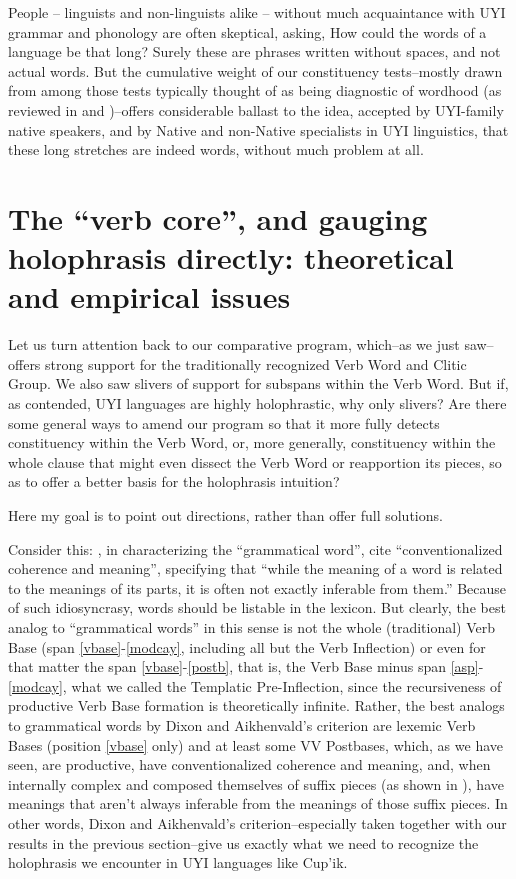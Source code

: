 \documentclass[output=paper]{langscibook}
\begin{document}
People -- linguists and non-linguists alike -- without much acquaintance with UYI grammar and phonology are often skeptical, asking, How could the words of a language be that long? Surely these are phrases written without spaces, and not actual words. But the cumulative weight of our constituency tests--mostly drawn from among those tests typically thought of as being diagnostic of wordhood (as reviewed in \citealt{haspelmathword:2011} and \citealt{Tallman2020})--offers considerable ballast to the idea, accepted by UYI-family native speakers, and by Native and non-Native specialists in UYI linguistics, that these long stretches are indeed words, without much problem at all.


\section{The ``verb core'', and gauging holophrasis directly: theoretical and empirical issues} \label{sec:6}

Let us turn attention back to our comparative program, which--as we just saw--offers strong support for the traditionally recognized Verb Word and Clitic Group. We also saw slivers of support for subspans within the Verb Word. But if, as contended, UYI languages are highly holophrastic, why only slivers? Are there some general ways to amend our program so that it more fully detects constituency within the Verb Word, or, more generally, constituency within the whole clause that might even dissect the Verb Word or reapportion its pieces, so as to offer a better basis for the holophrasis intuition?

Here my goal is to point out directions, rather than offer full solutions.

Consider this: \citet[19--20]{dixonaikhenvald:2002}, in characterizing the ``grammatical word'', cite ``conventionalized coherence and meaning'', specifying that ``while the meaning of a word is related to the meanings of its parts, it is often not exactly inferable from them.'' Because of such idiosyncrasy, words should be listable in the lexicon. But clearly, the best analog to ``grammatical words'' in this sense is not the whole (traditional) Verb Base (span \ref{vbase}-\ref{modcay}, including all but the Verb Inflection) or even for that matter the span \ref{vbase}-\ref{postb}, that is, the Verb Base minus span \ref{asp}-\ref{modcay}, what we called the Templatic Pre-Inflection, since the recursiveness of productive Verb Base formation  is theoretically infinite. Rather, the best analogs to grammatical words by Dixon and Aikhenvald's criterion are lexemic Verb Bases (position \ref{vbase} only) and at least some VV Postbases, which, as we have seen, are productive, have conventionalized coherence and meaning, and, when internally complex and composed themselves of suffix pieces (as shown in ), have meanings that aren't always inferable from the meanings of those suffix pieces. In other words, Dixon and Aikhenvald's criterion--especially taken together with our results in the previous section--give us exactly what we need to recognize the holophrasis we encounter in UYI languages like Cup'ik.
\end{document}
